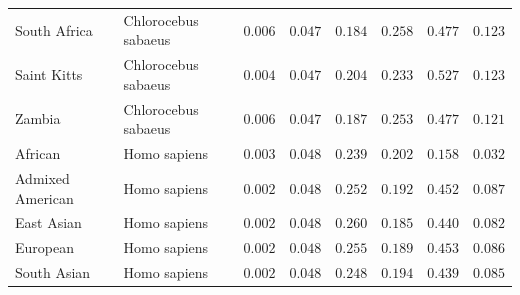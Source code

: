 \documentclass{article}
\begin{document}
\begin{center}
\begin{longtable*}{|l|l|r|r|r|r|r|r|}
            South Africa & Chlorocebus sabaeus &               $ 0.006$ &             $ 0.047$ &              $ 0.184$ &                                     $ 0.258$ &                       $ 0.477$ &                 $ 0.123$ \\
            Saint Kitts & Chlorocebus sabaeus &               $ 0.004$ &             $ 0.047$ &              $ 0.204$ &                                     $ 0.233$ &                       $ 0.527$ &                 $ 0.123$ \\
            Zambia & Chlorocebus sabaeus &               $ 0.006$ &             $ 0.047$ &              $ 0.187$ &                                     $ 0.253$ &                       $ 0.477$ &                 $ 0.121$ \\
            African &        Homo sapiens &               $ 0.003$ &             $ 0.048$ &              $ 0.239$ &                                     $ 0.202$ &                       $ 0.158$ &                 $ 0.032$ \\
            Admixed American &        Homo sapiens &               $ 0.002$ &             $ 0.048$ &              $ 0.252$ &                                     $ 0.192$ &                       $ 0.452$ &                 $ 0.087$ \\
            East Asian &        Homo sapiens &               $ 0.002$ &             $ 0.048$ &              $ 0.260$ &                                     $ 0.185$ &                       $ 0.440$ &                 $ 0.082$ \\
            European &        Homo sapiens &               $ 0.002$ &             $ 0.048$ &              $ 0.255$ &                                     $ 0.189$ &                       $ 0.453$ &                 $ 0.086$ \\
            South Asian &        Homo sapiens &               $ 0.002$ &             $ 0.048$ &              $ 0.248$ &                                     $ 0.194$ &                       $ 0.439$ &                 $ 0.085$ \\
        \end{longtable*}
    \end{center}
\end{document}
